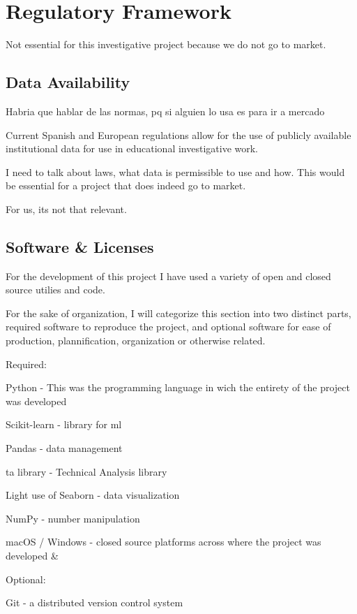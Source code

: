 \documentclass[12pt]{report} %
\begin{document}
\chapter{Regulatory Framework}
Not essential for this investigative project because we do not go to market.


\section{Data Availability}
Habria que hablar de las normas, pq si alguien lo usa es para ir a mercado

Current Spanish and European regulations allow for the use of publicly available institutional data for use in educational investigative work.

I need to talk about laws, what data is permissible to use and how. This would be essential for a project that does indeed go to market.

For us, its not that relevant.


\section{Software \& Licenses}

For the development of this project I have used a variety of open and closed source utilies and code.

For the sake of organization, I will categorize this section into two distinct parts, required software to reproduce the project, and optional software for ease of production, plannification, organization or otherwise related.

Required:

Python - This was the programming language in wich the entirety of the project was developed \cite{python}

Scikit-learn - library for ml \cite{scikit-learn}

Pandas - data management \cite{pandas}

ta library - Technical Analysis library\cite{ta-lib}

Light use of Seaborn - data visualization \cite{seaborn}

NumPy - number manipulation \cite{numpy}

macOS / Windows - closed source platforms across where the project was developed \cite{macos} \& \cite{windows}

Optional:

Git - a distributed version control system \cite{git}
\end{document}
